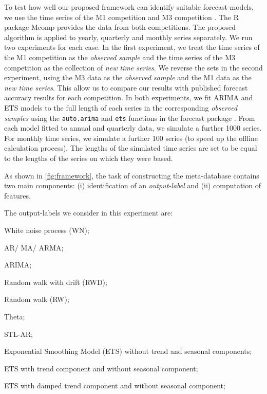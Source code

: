 \documentclass[11pt,a4paper,]{article}
\theoremstyle{definition}
\theoremstyle{definition}
\theoremstyle{definition}
\theoremstyle{remark}
\begin{document}
To test how well our proposed framework can identify suitable
forecast-models, we use the time series of the M1 competition
\autocite{makridakis1982accuracy} and M3 competition
\autocite{makridakis2000m3}. The R package Mcomp \autocite{hyndmanmcomp}
provides the data from both competitions. The proposed algorithm is
applied to yearly, quarterly and monthly series separately. We run two
experiments for each case. In the first experiment, we treat the time
series of the M1 competition as the \emph{observed sample} and the time
series of the M3 competition as the collection of \emph{new time
series}. We reverse the sets in the second experiment, using the M3 data
as the \emph{observed sample} and the M1 data as the \emph{new time
series}. This allow us to compare our results with published forecast
accuracy results for each competition. In both experiments, we fit ARIMA
and ETS models to the full length of each series in the corresponding
\emph{observed samples} using the \texttt{auto.arima} and \texttt{ets}
functions in the forecast package \autocite{forecast}. From each model
fitted to annual and quarterly data, we simulate a further 1000 series.
For monthly time series, we simulate a further 100 series (to speed up
the offline calculation process). The lengths of the simulated time
series are set to be equal to the lengths of the series on which they
were based.

As shown in \autoref{fig:framework}, the task of constructing the
meta-database contains two main components: (i) identification of an
\emph{output-label} and (ii) computation of features.

The output-labels we consider in this experiment are:

\begin{compactenum}[\hspace*{1cm}(a)]
  \item White noise process (WN);
  \item AR/ MA/ ARMA;
  \item ARIMA;
  \item Random walk with drift (RWD);
  \item Random walk (RW);
  \item Theta;
  \item STL-AR;
  \item Exponential Smoothing Model (ETS) without trend and seasonal components;
  \item ETS with trend component and without seasonal component;
  \item ETS with damped trend component and without seasonal component;
  \end{compactenum}
\end{document}
